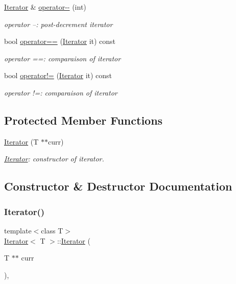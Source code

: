 \begin{DoxyCompactItemize}
\hyperlink{class_iterator}{Iterator} \& \hyperlink{class_iterator_a96b7f620a07d11a31335e8b43609625e}{operator-\/-\/} (int)
\begin{DoxyCompactList}\small\item\em operator --\+: post-\/decrement iterator \end{DoxyCompactList}\item 
bool \hyperlink{class_iterator_a81ed85772dc6f8251fc5d65cf57b7fa8}{operator==} (\hyperlink{class_iterator}{Iterator} it) const
\begin{DoxyCompactList}\small\item\em operator ==\+: comparaison of iterator \end{DoxyCompactList}\item 
bool \hyperlink{class_iterator_a5e8725bfbba9901f8148e427a9b8886a}{operator!=} (\hyperlink{class_iterator}{Iterator} it) const
\begin{DoxyCompactList}\small\item\em operator !=\+: comparaison of iterator \end{DoxyCompactList}\end{DoxyCompactItemize}
\subsection*{Protected Member Functions}
\begin{DoxyCompactItemize}
\item 
\hyperlink{class_iterator_a8d10287aafe1cac58db300c53c2a3f8c}{Iterator} (T $\ast$$\ast$curr)
\begin{DoxyCompactList}\small\item\em \hyperlink{class_iterator}{Iterator}\+: constructor of iterator. \end{DoxyCompactList}\end{DoxyCompactItemize}


\subsection{Constructor \& Destructor Documentation}
\mbox{\label{class_iterator_a8d10287aafe1cac58db300c53c2a3f8c}} 
\subsubsection{\texorpdfstring{Iterator()}{Iterator()}}
{\footnotesize\ttfamily template$<$class T$>$ \\
\hyperlink{class_iterator}{Iterator}$<$ T $>$\+::\hyperlink{class_iterator}{Iterator} (\begin{DoxyParamCaption}\item[{T $\ast$$\ast$}]{curr }\end{DoxyParamCaption})\hspace{0.3cm}{\ttfamily [inline]}, {\ttfamily [protected]}}



